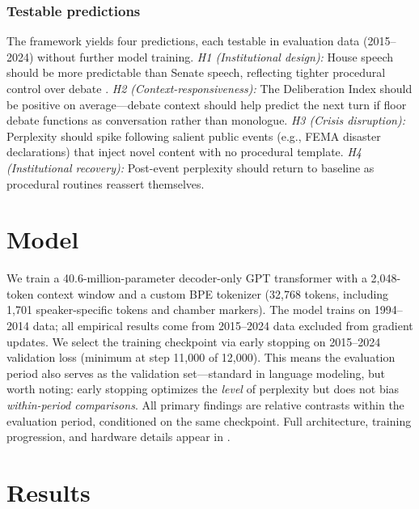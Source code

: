 \documentclass[12pt]{article}
\begin{document}
\subsubsection*{Testable predictions}
The framework yields four predictions, each testable in evaluation data (2015--2024) without further model training. \textit{H1 (Institutional design):} House speech should be more predictable than Senate speech, reflecting tighter procedural control over debate \citep{perssonTabellini2003}. \textit{H2 (Context-responsiveness):} The Deliberation Index should be positive on average---debate context should help predict the next turn if floor debate functions as conversation rather than monologue. \textit{H3 (Crisis disruption):} Perplexity should spike following salient public events (e.g., FEMA disaster declarations) that inject novel content with no procedural template. \textit{H4 (Institutional recovery):} Post-event perplexity should return to baseline as procedural routines reassert themselves.


\section{Model}
\label{sec:model}

We train a 40.6-million-parameter decoder-only GPT transformer \citep{karpathy2025} with a 2,048-token context window and a custom BPE tokenizer (32,768 tokens, including 1,701 speaker-specific tokens and chamber markers). The model trains on 1994--2014 data; all empirical results come from 2015--2024 data excluded from gradient updates. We select the training checkpoint via early stopping on 2015--2024 validation loss (minimum at step 11,000 of 12,000). This means the evaluation period also serves as the validation set---standard in language modeling, but worth noting: early stopping optimizes the \textit{level} of perplexity but does not bias \textit{within-period comparisons}. All primary findings are relative contrasts within the evaluation period, conditioned on the same checkpoint. Full architecture, training progression, and hardware details appear in .


\section{Results}
\end{document}
